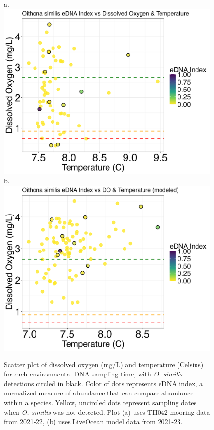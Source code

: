\documentclass[12pt,twoside]{reedthesis}
\begin{document}
	\begin{figure}[!h]
		\begin{center}
			a. \includegraphics[scale=0.3]{Osimilis_Scatter_noOut}
			b. \includegraphics[scale=0.3]{Osimilis_Scatter_AllYr_mod_noOut}
			\caption[\textit{O. similis} scatterplot]{\footnotesize{Scatter plot of dissolved oxygen (mg/L) and temperature (Celsius) for each environmental DNA sampling time, with \textit{O. similis} detections circled in black. Color of dots represents eDNA index, a normalized measure of abundance that can compare abundance within a species. Yellow, uncircled dots represent sampling dates when \textit{O. similis} was not detected. Plot (a) uses TH042 mooring data from 2021-22, (b) uses LiveOcean model data from 2021-23.}} %
			\label{OsimilisScatter}
		\end{center}
	\end{figure} 
	
\end{document}
